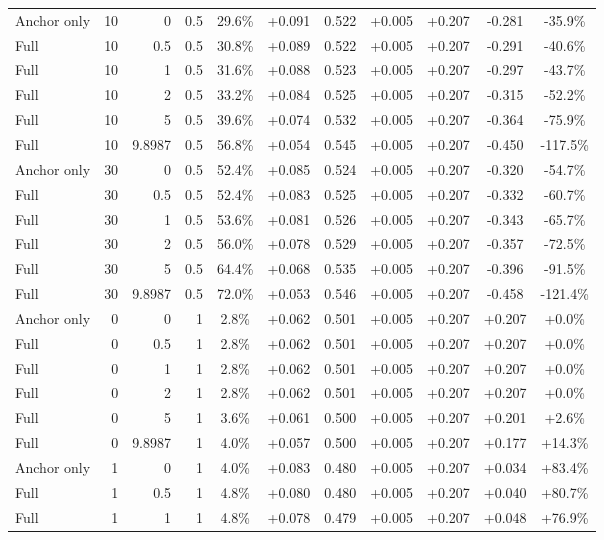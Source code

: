 \begin{table}[htbp]
\begin{tabular}{lrrrccccccc}
Anchor only & 10 & 0 & 0.5 & 29.6\% & +0.091 & 0.522 & +0.005 & +0.207 & -0.281 & -35.9\% \\
Full & 10 & 0.5 & 0.5 & 30.8\% & +0.089 & 0.522 & +0.005 & +0.207 & -0.291 & -40.6\% \\
Full & 10 & 1 & 0.5 & 31.6\% & +0.088 & 0.523 & +0.005 & +0.207 & -0.297 & -43.7\% \\
Full & 10 & 2 & 0.5 & 33.2\% & +0.084 & 0.525 & +0.005 & +0.207 & -0.315 & -52.2\% \\
Full & 10 & 5 & 0.5 & 39.6\% & +0.074 & 0.532 & +0.005 & +0.207 & -0.364 & -75.9\% \\
Full & 10 & 9.8987 & 0.5 & 56.8\% & +0.054 & 0.545 & +0.005 & +0.207 & -0.450 & -117.5\% \\
Anchor only & 30 & 0 & 0.5 & 52.4\% & +0.085 & 0.524 & +0.005 & +0.207 & -0.320 & -54.7\% \\
Full & 30 & 0.5 & 0.5 & 52.4\% & +0.083 & 0.525 & +0.005 & +0.207 & -0.332 & -60.7\% \\
Full & 30 & 1 & 0.5 & 53.6\% & +0.081 & 0.526 & +0.005 & +0.207 & -0.343 & -65.7\% \\
Full & 30 & 2 & 0.5 & 56.0\% & +0.078 & 0.529 & +0.005 & +0.207 & -0.357 & -72.5\% \\
Full & 30 & 5 & 0.5 & 64.4\% & +0.068 & 0.535 & +0.005 & +0.207 & -0.396 & -91.5\% \\
Full & 30 & 9.8987 & 0.5 & 72.0\% & +0.053 & 0.546 & +0.005 & +0.207 & -0.458 & -121.4\% \\
Anchor only & 0 & 0 & 1 & 2.8\% & +0.062 & 0.501 & +0.005 & +0.207 & +0.207 & +0.0\% \\
Full & 0 & 0.5 & 1 & 2.8\% & +0.062 & 0.501 & +0.005 & +0.207 & +0.207 & +0.0\% \\
Full & 0 & 1 & 1 & 2.8\% & +0.062 & 0.501 & +0.005 & +0.207 & +0.207 & +0.0\% \\
Full & 0 & 2 & 1 & 2.8\% & +0.062 & 0.501 & +0.005 & +0.207 & +0.207 & +0.0\% \\
Full & 0 & 5 & 1 & 3.6\% & +0.061 & 0.500 & +0.005 & +0.207 & +0.201 & +2.6\% \\
Full & 0 & 9.8987 & 1 & 4.0\% & +0.057 & 0.500 & +0.005 & +0.207 & +0.177 & +14.3\% \\
Anchor only & 1 & 0 & 1 & 4.0\% & +0.083 & 0.480 & +0.005 & +0.207 & +0.034 & +83.4\% \\
Full & 1 & 0.5 & 1 & 4.8\% & +0.080 & 0.480 & +0.005 & +0.207 & +0.040 & +80.7\% \\
Full & 1 & 1 & 1 & 4.8\% & +0.078 & 0.479 & +0.005 & +0.207 & +0.048 & +76.9\% \\

\end{tabular}
\end{table}
